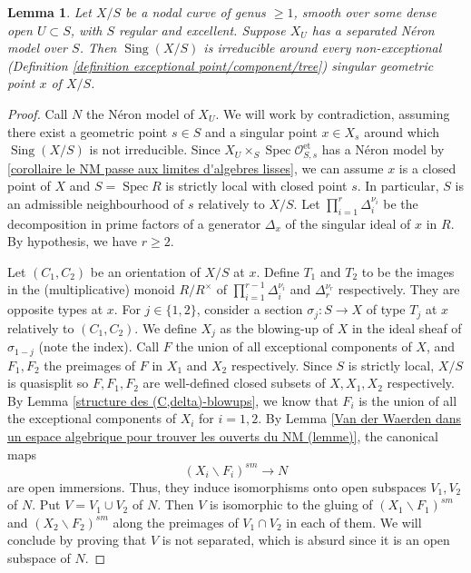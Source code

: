\documentclass[a4paper,10pt,twoside]{article}
\newcommand{\ra}{\rightarrow}
\newcommand{\on}[1]{\operatorname{#1}}
\renewcommand{\O}{\mathcal{O}}
\DeclareMathOperator{\spec}{Spec}
\DeclareMathOperator{\sing}{Sing}
\newtheorem{lem}[thm]{Lemma}
\theoremstyle{definition}
\theoremstyle{remark}
\renewcommand{\on}[1]{\operatorname{#1}}
\begin{document}
\begin{lem}\label{lemme necessite de l'irreducililite du lieu singulier}
Let $X/S$ be a nodal curve of genus $\geq 1$, smooth over some dense open $U\subset S$, with $S$ regular and excellent. Suppose $X_U$ has a separated N\'eron model over $S$. Then $\sing(X/S)$ is irreducible around every non-exceptional (Definition \ref{definition exceptional point/component/tree}) singular geometric point $x$ of $X/S$.
\end{lem}


\begin{proof}
Call $N$ the Néron model of $X_U$. We will work by contradiction, assuming there exist a geometric point $s\in S$ and a singular point $x\in X_s$ around which $\sing(X/S)$ is not irreducible. Since $X_U\times_S\spec\O_{S,s}^{\on{et}}$ has a N\'eron model by \ref{corollaire le NM passe aux limites d'algebres lisses}, we can assume $x$ is a closed point of $X$ and $S=\spec R$ is strictly local with closed point $s$. In particular, $S$ is an admissible neighbourhood of $s$ relatively to $X/S$. Let $\prod\limits_{i=1}^r\Delta_i^{\nu_i}$ be the decomposition in prime factors of a generator $\Delta_x$ of the singular ideal of $x$ in $R$. By hypothesis, we have $r\geq 2$.

Let $(C_1,C_2)$ be an orientation of $X/S$ at $x$. Define $T_1$ and $T_2$ to be the images in the (multiplicative) monoid $R/R^\times$ of $\prod\limits_{i=1}^{r-1}\Delta_i^{\nu_i}$ and $\Delta_r^{\nu_r}$ respectively. They are opposite types at $x$. For $j\in\{1,2\}$, consider a section $\sigma_j\colon S\to X$ of type $T_j$ at $x$ relatively to $(C_1,C_2)$. We define $X_j$ as the blowing-up of $X$ in the ideal sheaf of $\sigma_{1-j}$ (note the index). Call $F$ the union of all exceptional components of $X$, and $F_1,F_2$ the preimages of $F$ in $X_1$ and $X_2$ respectively. Since $S$ is strictly local, $X/S$ is quasisplit so $F,F_1,F_2$ are well-defined closed subsets of $X,X_1,X_2$ respectively. By Lemma \ref{structure des (C,delta)-blowups}, we know that $F_i$ is the union of all the exceptional components of $X_i$ for $i=1,2$. By Lemma \ref{Van der Waerden dans un espace algebrique pour trouver les ouverts du NM (lemme)}, the canonical maps
\[
(X_i\backslash F_i)^{sm}\ra N
\]
are open immersions. Thus, they induce isomorphisms onto open subspaces $V_1,V_2$ of $N$. Put $V=V_1\cup V_2$ of $N$. Then $V$ is isomorphic to the gluing of $(X_1\backslash F_1)^{sm}$ and $(X_2\backslash F_2)^{sm}$ along the preimages of $V_1\cap V_2$ in each of them. We will conclude by proving that $V$ is not separated, which is absurd since it is an open subspace of $N$.


\end{proof}
\end{document}

